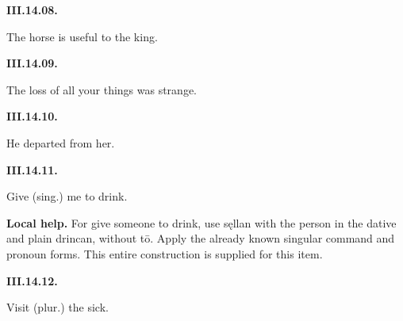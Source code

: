\par\begin{minipage}{\linewidth}\raggedright
\textbf{III.14.08.}

The horse is useful to the king.

\end{minipage}\par\addvspace{4pt}

\par\begin{minipage}{\linewidth}\raggedright
\textbf{III.14.09.}

The loss of all your things was strange.

\end{minipage}\par\addvspace{4pt}

\par\begin{minipage}{\linewidth}\raggedright
\textbf{III.14.10.}

He departed from her.

\end{minipage}\par\addvspace{4pt}

\par\begin{minipage}{\linewidth}\raggedright
\textbf{III.14.11.}

Give (sing.) me to drink.

\end{minipage}\par\addvspace{4pt}

\textbf{Local help.} For give someone to drink, use sęllan with the person in the dative and plain drincan, without tō. Apply the already known singular command and pronoun forms. This entire construction is supplied for this item.

\par\begin{minipage}{\linewidth}\raggedright
\textbf{III.14.12.}

Visit (plur.) the sick.

\end{minipage}\par\addvspace{4pt}

